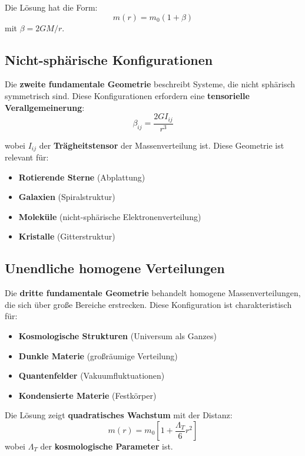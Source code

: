 \documentclass[12pt,a4paper]{report}
\begin{document}
Die Lösung hat die Form:
\begin{equation}
	m(r) = m_0(1 + \beta)
\end{equation}
mit $\beta = 2GM/r$.

\subsection{Nicht-sphärische Konfigurationen}

Die \textbf{zweite fundamentale Geometrie} beschreibt Systeme, die nicht sphärisch symmetrisch sind. Diese Konfigurationen erfordern eine \textbf{tensorielle Verallgemeinerung}:
\begin{equation}
	\beta_{ij} = \frac{2G I_{ij}}{r^3}
\end{equation}

wobei $I_{ij}$ der \textbf{Trägheitstensor} der Massenverteilung ist. Diese Geometrie ist relevant für:
\begin{itemize}
	\item \textbf{Rotierende Sterne} (Abplattung)
	\item \textbf{Galaxien} (Spiralstruktur)
	\item \textbf{Moleküle} (nicht-sphärische Elektronenverteilung)
	\item \textbf{Kristalle} (Gitterstruktur)
\end{itemize}

\subsection{Unendliche homogene Verteilungen}

Die \textbf{dritte fundamentale Geometrie} behandelt homogene Massenverteilungen, die sich über große Bereiche erstrecken. Diese Konfiguration ist charakteristisch für:
\begin{itemize}
	\item \textbf{Kosmologische Strukturen} (Universum als Ganzes)
	\item \textbf{Dunkle Materie} (großräumige Verteilung)
	\item \textbf{Quantenfelder} (Vakuumfluktuationen)
	\item \textbf{Kondensierte Materie} (Festkörper)
\end{itemize}

Die Lösung zeigt \textbf{quadratisches Wachstum} mit der Distanz:
\begin{equation}
	m(r) = m_0\left[1 + \frac{\Lambda_T}{6}r^2\right]
\end{equation}
wobei $\Lambda_T$ der \textbf{kosmologische Parameter} ist.
\end{document}
